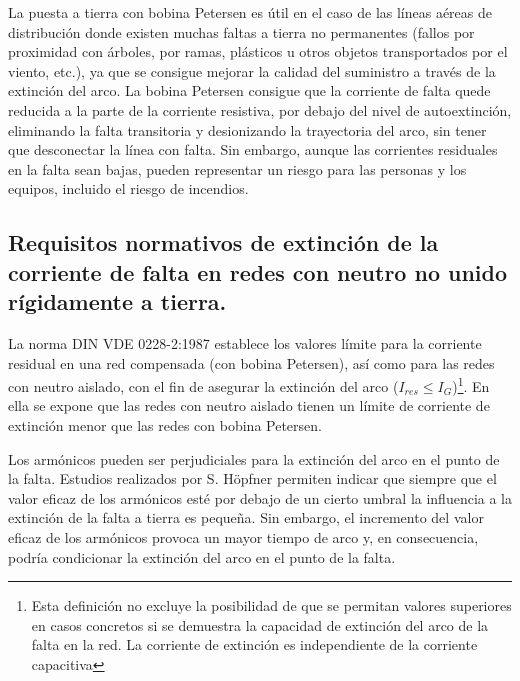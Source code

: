             La puesta a tierra con bobina Petersen es útil en el caso de las líneas aéreas de distribución donde existen muchas faltas a tierra no permanentes (fallos por proximidad con árboles, por ramas, plásticos u otros objetos transportados por el viento, etc.), ya que se consigue mejorar la calidad del suministro a través de la extinción del arco. La bobina Petersen consigue que la corriente de falta quede reducida a la parte de la corriente resistiva, por debajo del nivel de autoextinción, eliminando la falta transitoria y desionizando la trayectoria del arco, sin tener que desconectar la línea con falta. Sin embargo, aunque las corrientes residuales en la falta sean bajas, pueden representar un riesgo para las personas y los equipos, incluido el riesgo de incendios.\newline

        \subsection{Requisitos normativos de extinción de la corriente de falta en redes con neutro no unido rígidamente a tierra.}
            La norma DIN VDE 0228-2:1987 establece los valores límite para la corriente residual en una red compensada (con bobina Petersen), así como para las redes con neutro aislado, con el fin de asegurar la extinción del arco ($I_\textit{res} \leq I_\textit{G}$)\footnote{Esta definición no excluye la posibilidad de que se permitan valores superiores en casos concretos si se demuestra la capacidad de extinción del arco de la falta en la red. La corriente de extinción es independiente de la corriente capacitiva}. En ella se expone que las redes con neutro aislado tienen un límite de corriente de extinción menor que las redes con bobina Petersen.\newline

            Los armónicos pueden ser perjudiciales para la extinción del arco en el punto de la falta. Estudios realizados por S. Höpfner permiten indicar que siempre que el valor eficaz de los armónicos esté por debajo de un cierto umbral la influencia a la extinción de la falta a tierra es pequeña. Sin embargo, el incremento del valor eficaz de los armónicos provoca un mayor tiempo de arco y, en consecuencia, podría condicionar la extinción del arco en el punto de la falta.\newline

